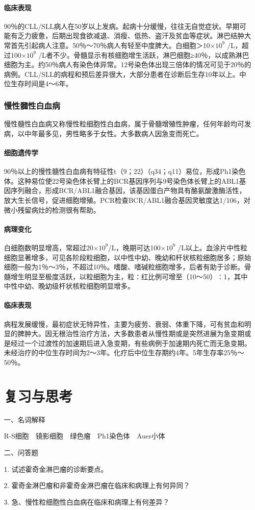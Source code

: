 \paragraph{临床表现}
90％的CLL/SLL病人在50岁以上发病。起病十分缓慢，往往无自觉症状。早期可能有乏力疲惫，后期出现食欲减退、消瘦、低热、盗汗及贫血等症状。淋巴结肿大常首先引起病人注意。50％～70％病人有轻至中度脾大。白细胞＞10$\times 10^9$
/L，超过100$\times 10^9$
/L者不少。骨髓显示有核细胞增生活跃，淋巴细胞≥40％，以成熟淋巴细胞为主。约50％病人有染色体异常。12号染色体出现三倍体的情况可见于20％的病例。CLL/SLL的病程和预后差异很大，大部分患者在诊断后生存10年以上。中位生存时间是4～6年。

\subsubsection{慢性髓性白血病}

慢性髓性白血病又称慢性粒细胞性白血病，属于骨髓增殖性肿瘤，任何年龄均可发病，以中年最多见，男性略多于女性。大多数病人因急变而死亡。

\paragraph{细胞遗传学}
90％以上的慢性髓性白血病有特征性t（9；22）（q34；q11）易位，形成Ph1染色体。这种易位使22号染色体长臂上的BCR基因序列与9号染色体长臂上的ABL1基因序列融合，形成BCR/ABL1融合基因，该基因蛋白产物具有酪氨酸激酶活性，放大生长信号，促进细胞增殖。PCR检查BCR/ABL1融合基因灵敏度达1/106，对微小残留病灶的检测很有帮助。

\paragraph{病理变化}
白细胞数明显增高，常超过20$\times 10^9$/L，晚期可达100$\times 10^9$
/L以上。血涂片中性粒细胞显著增多，可见各阶段粒细胞，以中性中幼、晚幼和杆状核粒细胞居多；原始细胞一般为1％～3％，不超过10％。嗜酸、嗜碱粒细胞增多，后者有助于诊断。骨髓增生明显至极度活跃，以粒细胞为主，粒∶红比例可增至（10～50）∶1，其中中性中幼、晚幼级杆状核粒细胞明显增多。

\paragraph{临床表现}
病程发展缓慢，最初症状无特异性，主要为疲劳、衰弱、体重下降，可有贫血和明显的脾肿大。因无根治性治疗方法，大多数患者从慢性期或是突然进展为急变期或是经过一个过渡性的加速期后进入急变期，有些病例于加速期内死亡而无急变期。未经治疗的中位生存时间为2～3年。化疗后中位生存期约4年。5年生存率25％～50％。

\section*{复习与思考}

{一、名词解释}

R-S细胞　镜影细胞　绿色瘤　Ph1染色体　Auer小体

{二、问答题}

1. 试述霍奇金淋巴瘤的诊断要点。

2. 霍奇金淋巴瘤和非霍奇金淋巴瘤在临床和病理上有何异同？

3. 急、慢性粒细胞性白血病在临床和病理上有何差异？